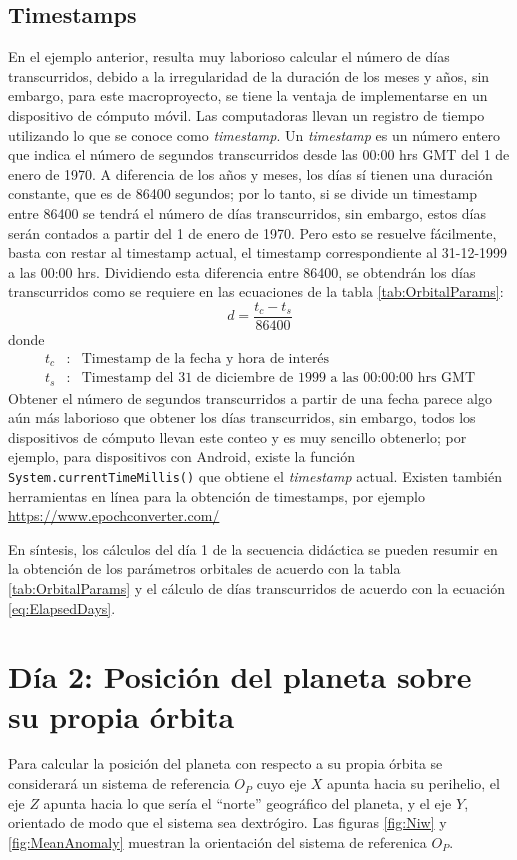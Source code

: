 \documentclass[a4paper,10pt]{article}
\begin{document}
\subsection{Timestamps}
En el ejemplo anterior, resulta muy laborioso calcular el número de días transcurridos, debido a la irregularidad de la duración de los meses y años, sin embargo, para este macroproyecto, se tiene la ventaja de implementarse en un dispositivo de cómputo móvil. Las computadoras llevan un registro de tiempo utilizando lo que se conoce como \textit{timestamp}. Un \textit{timestamp} es un número entero que indica el número de segundos transcurridos desde las 00:00 hrs GMT del 1 de enero de 1970. A diferencia de los años y meses, los días sí tienen una duración constante, que es de 86400 segundos; por lo tanto, si se divide un timestamp entre 86400 se tendrá el número de días transcurridos, sin embargo, estos días serán contados a partir del 1 de enero de 1970. Pero esto se resuelve fácilmente, basta con restar al timestamp actual, el timestamp correspondiente al 31-12-1999 a las 00:00 hrs. Dividiendo esta diferencia entre 86400, se obtendrán los días transcurridos como se requiere en las ecuaciones de la tabla \ref{tab:OrbitalParams}:
\begin{equation}
  d = \frac{t_c - t_s}{86400}
  \label{eq:ElapsedDays}
\end{equation}
donde
\begin{eqnarray*}
  t_c &:& \textrm{Timestamp de la fecha y hora de interés}\\
  t_s &:& \textrm{Timestamp del 31 de diciembre de 1999 a las 00:00:00 hrs GMT}
\end{eqnarray*}
Obtener el número de segundos transcurridos a partir de una fecha parece algo aún más laborioso que obtener los días transcurridos, sin embargo, todos los dispositivos de cómputo llevan este conteo y es muy sencillo obtenerlo; por ejemplo, para dispositivos con Android, existe la función \texttt{System.currentTimeMillis()} que obtiene el \textit{timestamp} actual. Existen también herramientas en línea para la obtención de timestamps, por ejemplo \url{https://www.epochconverter.com/}

En síntesis, los cálculos del día 1 de la secuencia didáctica se pueden resumir en la obtención de los parámetros orbitales de acuerdo con la tabla \ref{tab:OrbitalParams} y el cálculo de días transcurridos de acuerdo con la ecuación \ref{eq:ElapsedDays}.

\section{Día 2: Posición del planeta sobre su propia órbita}
Para calcular la posición del planeta con respecto a su propia órbita se considerará un sistema de referencia $O_P$ cuyo eje $X$ apunta hacia su perihelio, el eje $Z$ apunta hacia lo que sería el ``norte'' geográfico del planeta, y el eje $Y$, orientado de modo que el sistema sea dextrógiro. Las figuras \ref{fig:Niw} y \ref{fig:MeanAnomaly} muestran la orientación del sistema de referenica $O_P$.
\end{document}
